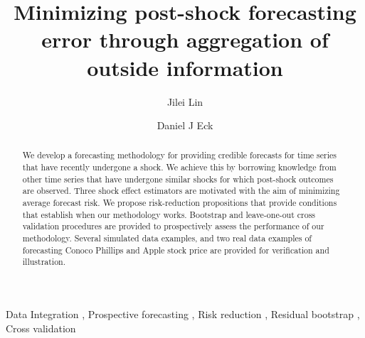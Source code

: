 \documentclass[11pt,3p,review,authoryear]{elsarticle}
\begin{document}
\begin{frontmatter}

\title{Minimizing post-shock forecasting error through aggregation of outside information}

  \author[uiuc]{Jilei Lin}

 \author[uiuc]{Daniel J Eck}
 \address[uiuc]{Department of Statistics, University of Illinois at Urbana-Champaign\\
 725 S. Wright St., Champaign, IL, 61820, U.S.}


\begin{abstract}
   We develop a forecasting methodology for providing credible forecasts for time series that have recently undergone a shock. We achieve this by borrowing knowledge from other time series that have undergone similar shocks for which post-shock outcomes are observed. Three shock effect estimators are motivated with the aim of minimizing average forecast risk. We propose risk-reduction propositions that provide conditions that establish when our methodology works. Bootstrap and leave-one-out cross validation procedures are provided to prospectively assess the performance of our methodology. Several simulated data examples, and two real data examples of forecasting Conoco Phillips and Apple stock price are provided for verification and illustration.
\end{abstract}

\begin{keyword}
  Data Integration \sep 
 Prospective forecasting \sep 
 Risk reduction \sep 
Residual bootstrap \sep 
Cross validation 
\end{keyword}

\end{frontmatter}
\end{document}
